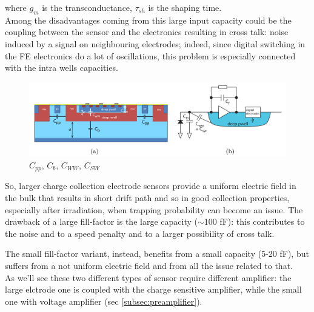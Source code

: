       where $g_m$ is the transconductance, $\tau_{sh}$ is the shaping time. \\
      Among the disadvantages coming from this large input capacity could be the coupling between the sensor and the electronics resulting in cross talk: noise induced by a signal on neighbouring electrodes; indeed, since digital switching in the FE electronics do a lot of oscillations, this problem is especially connected with the intra wells capacities.
      \begin{figure}[h!]
         \centering\includegraphics[width=12cm]{figures/Pixel_detectors/DMAPS_capacity.png}
         \caption{$C_{pp}$, $C_{b}$, $C_{WW}$, $C_{SW}$}
         \label{fig:DMAPS_capacity}
      \end{figure}
      So, larger charge collection electrode sensors provide a uniform electric field in the bulk that results in short drift path and so in good collection properties, especially after irradiation, when trapping probability can become an issue. The drawback of a large fill-factor is the large capacity ($\sim$100 fF): this contributes to the noise and to a speed penalty and to a larger possibility of cross talk.

      The small fill-factor variant, instead, benefits from a small capacity (5-20 fF), but suffers from a not uniform electric field and from all the issue related to that. \\
      As we'll see these two different types of sensor require different amplifier: the large elctrode one is coupled with the charge sensitive amplifier, while the small one with voltage amplifier (sec \ref{subsec:preamplifier}).

